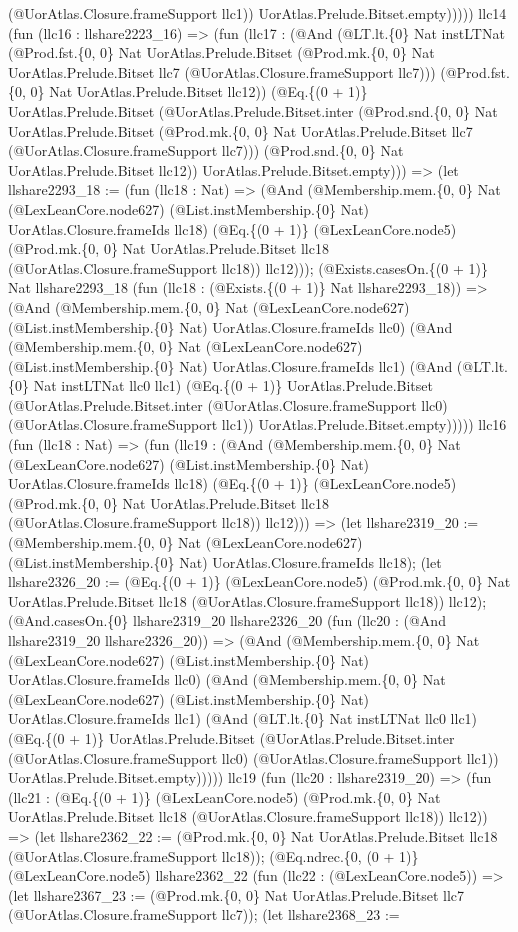 \documentclass[11pt]{article}
\begin{document}
(@UorAtlas.Closure.frameSupport llc1)) UorAtlas.Prelude.Bitset.empty))))) llc14 (fun (llc16 : llshare2223\_16) => (fun (llc17 : (@And (@LT.lt.\{0\} Nat instLTNat (@Prod.fst.\{0, 0\} Nat UorAtlas.Prelude.Bitset (@Prod.mk.\{0, 0\} Nat UorAtlas.Prelude.Bitset llc7 (@UorAtlas.Closure.frameSupport llc7))) (@Prod.fst.\{0, 0\} Nat UorAtlas.Prelude.Bitset llc12)) (@Eq.\{(0 + 1)\} UorAtlas.Prelude.Bitset (@UorAtlas.Prelude.Bitset.inter (@Prod.snd.\{0, 0\} Nat UorAtlas.Prelude.Bitset (@Prod.mk.\{0, 0\} Nat UorAtlas.Prelude.Bitset llc7 (@UorAtlas.Closure.frameSupport llc7))) (@Prod.snd.\{0, 0\} Nat UorAtlas.Prelude.Bitset llc12)) UorAtlas.Prelude.Bitset.empty))) => (let llshare2293\_18 := (fun (llc18 : Nat) => (@And (@Membership.mem.\{0, 0\} Nat (@LexLeanCore.node627) (@List.instMembership.\{0\} Nat) UorAtlas.Closure.frameIds llc18) (@Eq.\{(0 + 1)\} (@LexLeanCore.node5) (@Prod.mk.\{0, 0\} Nat UorAtlas.Prelude.Bitset llc18 (@UorAtlas.Closure.frameSupport llc18)) llc12))); (@Exists.casesOn.\{(0 + 1)\} Nat llshare2293\_18 (fun (llc18 : (@Exists.\{(0 + 1)\} Nat llshare2293\_18)) => (@And (@Membership.mem.\{0, 0\} Nat (@LexLeanCore.node627) (@List.instMembership.\{0\} Nat) UorAtlas.Closure.frameIds llc0) (@And (@Membership.mem.\{0, 0\} Nat (@LexLeanCore.node627) (@List.instMembership.\{0\} Nat) UorAtlas.Closure.frameIds llc1) (@And (@LT.lt.\{0\} Nat instLTNat llc0 llc1) (@Eq.\{(0 + 1)\} UorAtlas.Prelude.Bitset (@UorAtlas.Prelude.Bitset.inter (@UorAtlas.Closure.frameSupport llc0) (@UorAtlas.Closure.frameSupport llc1)) UorAtlas.Prelude.Bitset.empty))))) llc16 (fun (llc18 : Nat) => (fun (llc19 : (@And (@Membership.mem.\{0, 0\} Nat (@LexLeanCore.node627) (@List.instMembership.\{0\} Nat) UorAtlas.Closure.frameIds llc18) (@Eq.\{(0 + 1)\} (@LexLeanCore.node5) (@Prod.mk.\{0, 0\} Nat UorAtlas.Prelude.Bitset llc18 (@UorAtlas.Closure.frameSupport llc18)) llc12))) => (let llshare2319\_20 := (@Membership.mem.\{0, 0\} Nat (@LexLeanCore.node627) (@List.instMembership.\{0\} Nat) UorAtlas.Closure.frameIds llc18); (let llshare2326\_20 := (@Eq.\{(0 + 1)\} (@LexLeanCore.node5) (@Prod.mk.\{0, 0\} Nat UorAtlas.Prelude.Bitset llc18 (@UorAtlas.Closure.frameSupport llc18)) llc12); (@And.casesOn.\{0\} llshare2319\_20 llshare2326\_20 (fun (llc20 : (@And llshare2319\_20 llshare2326\_20)) => (@And (@Membership.mem.\{0, 0\} Nat (@LexLeanCore.node627) (@List.instMembership.\{0\} Nat) UorAtlas.Closure.frameIds llc0) (@And (@Membership.mem.\{0, 0\} Nat (@LexLeanCore.node627) (@List.instMembership.\{0\} Nat) UorAtlas.Closure.frameIds llc1) (@And (@LT.lt.\{0\} Nat instLTNat llc0 llc1) (@Eq.\{(0 + 1)\} UorAtlas.Prelude.Bitset (@UorAtlas.Prelude.Bitset.inter (@UorAtlas.Closure.frameSupport llc0) (@UorAtlas.Closure.frameSupport llc1)) UorAtlas.Prelude.Bitset.empty))))) llc19 (fun (llc20 : llshare2319\_20) => (fun (llc21 : (@Eq.\{(0 + 1)\} (@LexLeanCore.node5) (@Prod.mk.\{0, 0\} Nat UorAtlas.Prelude.Bitset llc18 (@UorAtlas.Closure.frameSupport llc18)) llc12)) => (let llshare2362\_22 := (@Prod.mk.\{0, 0\} Nat UorAtlas.Prelude.Bitset llc18 (@UorAtlas.Closure.frameSupport llc18)); (@Eq.ndrec.\{0, (0 + 1)\} (@LexLeanCore.node5) llshare2362\_22 (fun (llc22 : (@LexLeanCore.node5)) => (let llshare2367\_23 := (@Prod.mk.\{0, 0\} Nat UorAtlas.Prelude.Bitset llc7 (@UorAtlas.Closure.frameSupport llc7)); (let llshare2368\_23 := 
\end{document}
